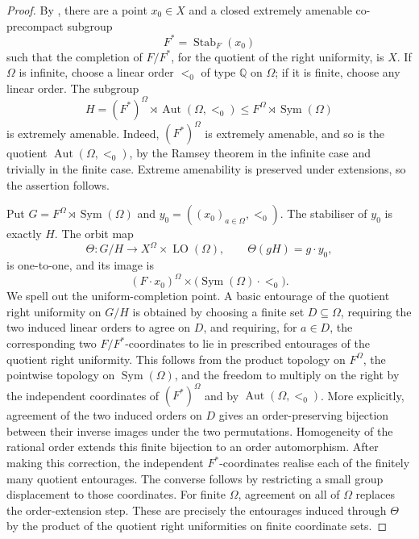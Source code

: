 \begin{proof}
By \cite[Theorem~1.1]{BYMT2017}, there are a point \(x_0\in X\) and a closed
extremely amenable co-precompact subgroup
\[
 F^*=\operatorname{Stab}_F(x_0)
\]
such that the completion of \(F/F^*\), for the quotient of the right
uniformity, is \(X\).  If \(\Omega\) is infinite, choose a linear order
\(<_0\) of type \(\mathbb Q\) on \(\Omega\); if it is finite, choose any
linear order.  The subgroup
\[
 H=(F^*)^\Omega\rtimes\operatorname{Aut}(\Omega,<_0)
 \leq F^\Omega\rtimes\operatorname{Sym}(\Omega)
\]
is extremely amenable. Indeed, \((F^*)^\Omega\) is extremely amenable, and
so is the quotient \(\operatorname{Aut}(\Omega,<_0)\), by the Ramsey theorem
in the infinite case and trivially in the finite case. Extreme amenability is
preserved under extensions, so the assertion follows.

Put \(G=F^\Omega\rtimes\operatorname{Sym}(\Omega)\) and
\(y_0=((x_0)_{a\in\Omega},<_0)\). The stabiliser of \(y_0\) is exactly \(H\).
The orbit map
\[
 \Theta:G/H\longrightarrow X^\Omega\times\operatorname{LO}(\Omega),
 \qquad \Theta(gH)=g\mathbin{\cdot}y_0,
\]
is one-to-one, and its image is
\[
 (F\mathbin{\cdot}x_0)^\Omega\times
 \bigl(\operatorname{Sym}(\Omega)\mathbin{\cdot}<_0\bigr).
\]
We spell out the uniform-completion point. A basic entourage of the quotient
right uniformity on \(G/H\) is obtained by choosing a finite set
\(D\subseteq\Omega\), requiring the two induced linear orders to agree on
\(D\),
and requiring, for \(a\in D\), the corresponding two \(F/F^*\)-coordinates
to lie in prescribed entourages of the quotient right uniformity. This follows
from the product topology on \(F^\Omega\), the pointwise topology on
\(\operatorname{Sym}(\Omega)\), and the freedom to multiply on the right by
the independent coordinates of \((F^*)^\Omega\) and by
\(\operatorname{Aut}(\Omega,<_0)\). More explicitly, agreement of the two
induced orders on \(D\) gives an order-preserving bijection between their
inverse images under the two permutations. Homogeneity of the rational order
extends this finite bijection to an order automorphism. After making this
correction, the independent \(F^*\)-coordinates realise each of the finitely
many quotient entourages. The converse follows by restricting a small group
displacement to those coordinates. For finite \(\Omega\), agreement on all
of \(\Omega\) replaces the order-extension step. These are precisely the entourages induced
through \(\Theta\) by the product of the quotient right uniformities on finite
coordinate sets.


\end{proof}
